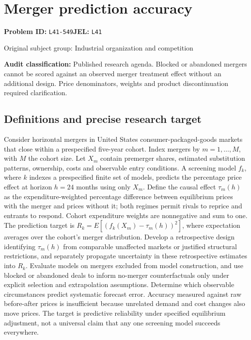 \documentclass[11pt,a4paper]{article}
\begin{document}
\section*{Merger prediction accuracy}
\textbf{Problem ID:} \texttt{L41-549}\quad \textbf{JEL:} \texttt{L41}\par
\label{problem:OP-0392}
{\sffamily\small\color{muted}Original subject group: Industrial organization and competition\par}
\label{definitions:problem:30007674}
\textbf{Audit classification:} Published research agenda. Blocked or abandoned mergers cannot be scored against an observed merger treatment effect without an additional design. Price denominators, weights and product discontinuation required clarification.
\subsection*{Definitions and precise research target}
Consider horizontal mergers in United States consumer-packaged-goods markets that close within a prespecified five-year cohort. Index mergers by \(m=1,\ldots,M\), with \(M\) the cohort size. Let \(X_m\) contain premerger shares, estimated substitution patterns, ownership, costs and observable entry conditions. A screening model \(f_k\), where \(k\) indexes a prespecified finite set of models, predicts the percentage price effect at horizon \(h=24\) months using only \(X_m\). Define the causal effect \(\tau_m(h)\) as the expenditure-weighted percentage difference between equilibrium prices with the merger and prices without it; both regimes permit rivals to reprice and entrants to respond. Cohort expenditure weights are nonnegative and sum to one. The prediction target is \(R_k=E[(f_k(X_m)-\tau_m(h))^2]\), where expectation averages over the cohort's merger distribution. Develop a retrospective design identifying \(\tau_m(h)\) from comparable unaffected markets or justified structural restrictions, and separately propagate uncertainty in these retrospective estimates into \(R_k\). Evaluate models on mergers excluded from model construction, and use blocked or abandoned deals to inform no-merger counterfactuals only under explicit selection and extrapolation assumptions. Determine which observable circumstances predict systematic forecast error. Accuracy measured against raw before-after prices is insufficient because unrelated demand and cost changes also move prices. The target is predictive reliability under specified equilibrium adjustment, not a universal claim that any one screening model succeeds everywhere.
\end{document}
